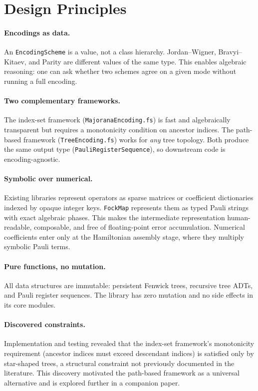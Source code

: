 \documentclass[10pt,a4paper]{article}
\begin{document}
\section*{Design Principles}

\paragraph{Encodings as data.}
An \texttt{EncodingScheme} is a value, not a class hierarchy.
Jordan--Wigner, Bravyi--Kitaev, and Parity are different values of the
same type.  This enables algebraic reasoning: one can ask whether two
schemes agree on a given mode without running a full encoding.

\paragraph{Two complementary frameworks.}
The index-set framework (\texttt{MajoranaEncoding.fs}) is fast and
algebraically transparent but requires a monotonicity condition on
ancestor indices.  The path-based framework (\texttt{TreeEncoding.fs})
works for \emph{any} tree topology.  Both produce the same output type
(\texttt{PauliRegisterSequence}), so downstream code is
encoding-agnostic.

\paragraph{Symbolic over numerical.}
Existing libraries represent operators as sparse matrices or coefficient
dictionaries indexed by opaque integer keys.  \texttt{FockMap}
represents them as typed Pauli strings with exact algebraic phases.
This makes the intermediate representation human-readable, composable,
and free of floating-point error accumulation.  Numerical coefficients
enter only at the Hamiltonian assembly stage, where they multiply
symbolic Pauli terms.

\paragraph{Pure functions, no mutation.}
All data structures are immutable: persistent Fenwick trees, recursive
tree ADTs, and Pauli register sequences.  The library has zero mutation
and no side effects in its core modules.

\paragraph{Discovered constraints.}
Implementation and testing revealed that the index-set framework's
monotonicity requirement (ancestor indices must exceed descendant
indices) is satisfied only by star-shaped trees, a structural
constraint not previously documented in the literature.  This discovery
motivated the path-based framework as a universal alternative and is
explored further in a companion paper.
\end{document}

